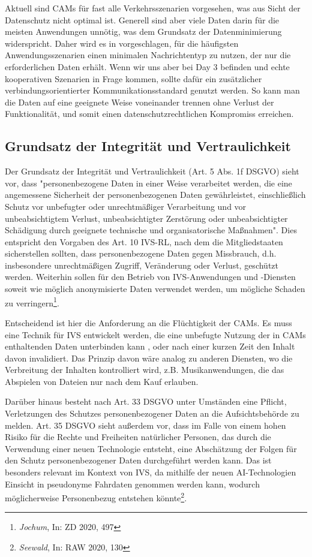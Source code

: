 Aktuell sind CAMs für fast alle Verkehrsszenarien vorgesehen, was aus Sicht der Datenschutz nicht optimal ist. Generell sind aber viele Daten darin für die meisten Anwendungen unnötig, was dem Grundsatz der Datenminimierung widerspricht. Daher wird es in \cite{Kiometzis2017} vorgeschlagen, für die häufigsten Anwendungsszenarien einen minimalen Nachrichtentyp zu nutzen, der nur die erforderlichen Daten erhält. Wenn wir uns aber bei Day 3 befinden und echte kooperativen Szenarien in Frage kommen, sollte dafür ein zusätzlicher verbindungsorientierter Kommunikationsstandard genutzt werden. So kann man die Daten auf eine geeignete Weise voneinander trennen ohne Verlust der Funktionalität, und somit einen datenschutzrechtlichen Kompromiss erreichen.

\subsection{Grundsatz der Integrität und Vertraulichkeit}

Der Grundsatz der Integrität und Vertraulichkeit (Art. 5 Abs. 1f DSGVO) sieht vor, dass "personenbezogene Daten in einer Weise verarbeitet werden, die eine angemessene Sicherheit der personenbezogenen Daten gewährleistet, einschließlich Schutz vor unbefugter oder unrechtmäßiger Verarbeitung und vor unbeabsichtigtem Verlust, unbeabsichtigter Zerstörung oder unbeabsichtigter Schädigung durch geeignete technische und organisatorische Maßnahmen". Dies entspricht den Vorgaben des Art. 10 IVS-RL, nach dem die Mitgliedstaaten sicherstellen sollten, dass personenbezogene Daten gegen Missbrauch, d.h. insbesondere unrechtmäßigen Zugriff, Veränderung oder Verlust, geschützt werden. Weiterhin sollen für den Betrieb von IVS-Anwendungen und -Diensten soweit wie möglich anonymisierte Daten verwendet werden, um mögliche Schaden zu verringern\footnote{\emph{Jochum}, In: ZD 2020, 497}. 

Entscheidend ist hier die Anforderung an die Flüchtigkeit der CAMs. Es muss eine Technik für IVS entwickelt werden, die eine unbefugte Nutzung der in CAMs enthaltenden Daten unterbinden kann \cite{Kiometzis2017}, oder nach einer kurzen Zeit den Inhalt davon invalidiert. Das Prinzip davon wäre analog zu anderen Diensten, wo die Verbreitung der Inhalten kontrolliert wird, z.B. Musikanwendungen, die das Abspielen von Dateien nur nach dem Kauf erlauben. 

Darüber hinaus besteht nach Art. 33 DSGVO unter Umständen eine Pflicht, Verletzungen des Schutzes personenbezogener Daten an die Aufsichtsbehörde zu melden. Art. 35 DSGVO sieht außerdem vor, dass im Falle von einem hohen Risiko für die Rechte und Freiheiten natürlicher Personen, das durch die Verwendung einer neuen Technologie entsteht, eine Abschätzung der Folgen für den Schutz personenbezogener Daten durchgeführt werden kann. Das ist besonders relevant im Kontext von IVS, da mithilfe der neuen AI-Technologien Einsicht in pseudonyme Fahrdaten genommen werden kann, wodurch möglicherweise Personenbezug entstehen könnte\footnote{\emph{Seewald}, In: RAW 2020, 130}. 

